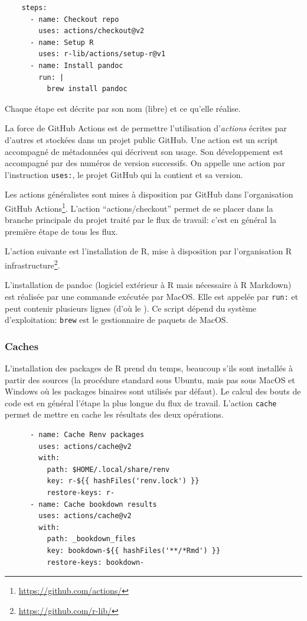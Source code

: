 \documentclass[
  11pt,
  french,
  a4paper,
  extrafontsizes,onecolumn,openright
  ]{memoir}
\begin{document}
\begin{verbatim}
    steps:
      - name: Checkout repo
        uses: actions/checkout@v2
      - name: Setup R
        uses: r-lib/actions/setup-r@v1
      - name: Install pandoc
        run: |
          brew install pandoc
\end{verbatim}

Chaque étape est décrite par son nom (libre) et ce qu'elle réalise.

La force de GitHub Actions est de permettre l'utilisation d'\emph{actions} écrites par d'autres et stockées dans un projet public GitHub.
Une action est un script accompagné de métadonnées qui décrivent son usage.
Son développement est accompagné par des numéros de version successifs.
On appelle une action par l'instruction \texttt{uses:}, le projet GitHub qui la contient et sa version.

Les actions généralistes sont mises à disposition par GitHub dans l'organisation GitHub Actions\footnote{\url{https://github.com/actions/}}.
L'action ``actions/checkout'' permet de se placer dans la branche principale du projet traité par le flux de travail: c'est en général la première étape de tous les flux.

L'action suivante est l'installation de R, mise à disposition par l'organisation R infrastructure\footnote{\url{https://github.com/r-lib/}}.

L'installation de pandoc (logiciel extérieur à R mais nécessaire à R Markdown) est réalisée par une commande exécutée par MacOS.
Elle est appelée par \texttt{run:} et peut contenir plusieurs lignes (d'où le \texttt{\textbar{}}).
Ce script dépend du système d'exploitation: \texttt{brew} est le gestionnaire de paquets de MacOS.

\hypertarget{caches}{%
\subsubsection{Caches}\label{caches}}

L'installation des packages de R prend du temps, beaucoup s'ils sont installés à partir des sources (la procédure standard sous Ubuntu, mais pas sous MacOS et Windows où les packages binaires sont utilisés par défaut).
Le calcul des bouts de code est en général l'étape la plus longue du flux de travail.
L'action \texttt{cache} permet de mettre en cache les résultats des deux opérations.

\begin{verbatim}
      - name: Cache Renv packages
        uses: actions/cache@v2
        with:
          path: $HOME/.local/share/renv
          key: r-${{ hashFiles('renv.lock') }}
          restore-keys: r-
      - name: Cache bookdown results
        uses: actions/cache@v2
        with:
          path: _bookdown_files
          key: bookdown-${{ hashFiles('**/*Rmd') }}
          restore-keys: bookdown-
\end{verbatim}
\end{document}
